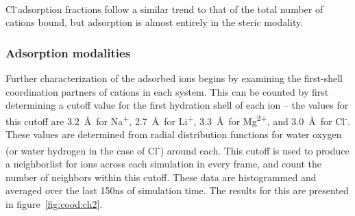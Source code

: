 \documentclass[12pt,openany,final]{book}
\newcommand{\cl}{Cl\textsuperscript{-}}
\begin{document}
\cl adsorption fractions follow a similar trend to that of the total number of cations bound, but adsorption
is almost entirely in the steric modality.




\subsubsection{Adsorption modalities}

Further characterization of the adsorbed ions begins by examining the first-shell coordination partners of cations in each system.
This can be counted by first determining a cutoff value for the first hydration shell of each ion 
-- the values for this cutoff are
3.2~\AA~for Na\textsuperscript{+}, 2.7~\AA~for Li\textsuperscript{+}, 3.3~\AA~for Mg\textsuperscript{2+}, 
and 3.0~\AA~for Cl\textsuperscript{-}. 
These values are determined from radial distribution 
functions for water oxygen (or water hydrogen in the case of \cl) around each. 
This cutoff is used to produce a neighborlist for ions
across each simulation in every frame, and count the number of neighbors within this cutoff. 
These data {are} histogrammed and averaged over
the last 150ns of simulation time. The results for this are presented in figure~\ref{fig:cood:ch2}.
\end{document}
